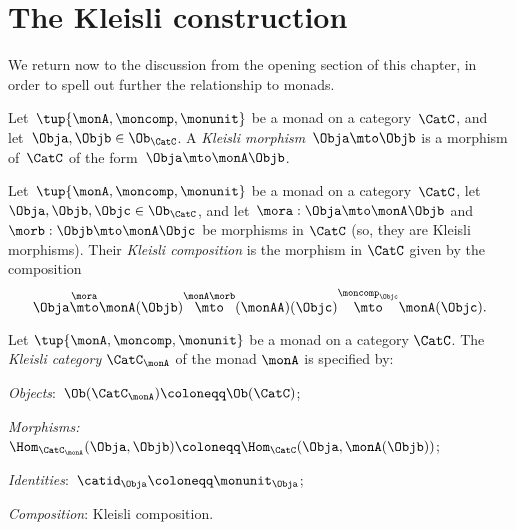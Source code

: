 

\section{The Kleisli construction}
\label{sec:Kleisli}

We return now to the discussion from the opening section of this chapter, in order to spell out further the relationship to monads.

\begin{ctdefinition}
    \label{def:kleislimor}
    Let~$\tup{\monA, \moncomp, \monunit}$ be a monad on a category~$\CatC$, and let~$\Obja, \Objb \in \Ob_\CatC$. A
    \emph{Kleisli morphism}~$\Obja \mto \Objb$ is a morphism of~$\CatC$ of the form~$\Obja \mto \monA \Objb$.
\end{ctdefinition}


\begin{ctdefinition}
    \label{def:kleislicomp}
    Let~$\tup{\monA, \moncomp, \monunit}$ be a monad on a category~$\CatC$, let~$\Obja, \Objb, \Objc \in \Ob_\CatC$,  and let~$\mora : \Obja \mto \monA \Objb$ and $\morb : \Objb \mto \monA \Objc$ be morphisms in $\CatC$ (so, they are Kleisli morphisms). Their \emph{Kleisli composition} is the morphism in $\CatC$ given by the composition
    \begin{equation}
        \Obja \overset{\mora}{\mto} \monA(\Objb) \overset{\monA \morb}{\mto} (\monAA)(\Objc) \overset{\moncomp_\Objc}{\mto} \monA(\Objc).
    \end{equation}
\end{ctdefinition}

\begin{ctdefinition}
    \label{def:kleislicat}
    Let $\tup{\monA, \moncomp, \monunit}$ be a monad on a category $\CatC$. The \emph{Kleisli category} $\CatC_\monA$ of the monad $\monA$ is specified by:
    \begin{compactenum}
        \item \emph{Objects}:~$\Ob(\CatC_\monA) \coloneqq \Ob(\CatC)$;
        \item \emph{Morphisms:}~$\Hom_{\CatC_\monA}(\Obja, \Objb) \coloneqq \Hom_{\CatC}(\Obja, \monA(\Objb))$;
        \item \emph{Identities}:~$\catid_\Obja \coloneqq \monunit_\Obja$;
        \item \emph{Composition}: Kleisli composition.
    \end{compactenum}
\end{ctdefinition}


